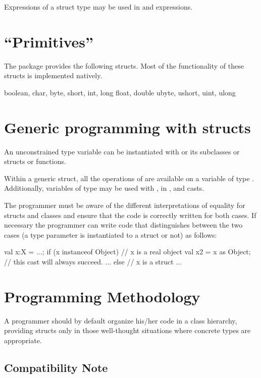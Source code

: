 Expressions of a struct type may be used in  and
 expressions.

\section{``Primitives''}

The package  provides the following structs. Most of
the functionality of these structs is implemented natively.

\begin{xten}
boolean, char, 
byte, short, int, long
float, double
ubyte, ushort, uint, ulong
\end{xten}
 
\section{Generic programming with structs}

An unconstrained type variable  can be instantiated with  or
its subclasses or structs or functions.

Within a generic struct, all the operations of  are available
on a variable of type . Additionally, variables of type  may
be used with \Xcd{==, !=}, in , and casts.

The programmer must be aware of the different interpretations of
equality for structs and classes and ensure that the code is correctly
written for both cases. If necessary the programmer can write code
that distinguishes between the two cases (a type parameter  is
instantiated to a struct or not) as follows:

\begin{xten}
val x:X = ...;
if (x instanceof Object) { // x is a real object
   val x2 = x as Object; // this cast will always succeed.
   ...
} else { // x is a struct
   ...
}
\end{xten}
 
  
\section{Programming Methodology}

 A programmer should by default organize his/her code in a class
 hierarchy, providing structs only in those well-thought situations
 where concrete types are appropriate.

\subsection{Compatibility Note}

